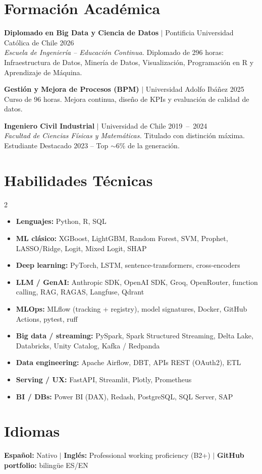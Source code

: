 \documentclass[a4paper,10pt]{article}
\newcommand{\sectionspace}{\vspace{0.15cm}}
\newcommand{\entryspace}{\vspace{0.12cm}}
\begin{document}
\sectionspace

\section*{Formación Académica}

\noindent\textbf{Diplomado en Big Data y Ciencia de Datos} $|$ Pontificia Universidad Católica de Chile \hfill 2026 \\
\textit{Escuela de Ingeniería -- Educación Continua.} Diplomado de 296 horas: Infraestructura de Datos, Minería de Datos, Visualización, Programación en R y Aprendizaje de Máquina.

\entryspace

\noindent\textbf{Gestión y Mejora de Procesos (BPM)} $|$ Universidad Adolfo Ibáñez \hfill 2025 \\
Curso de 96 horas. Mejora continua, diseño de KPIs y evaluación de calidad de datos.

\entryspace

\noindent\textbf{Ingeniero Civil Industrial} $|$ Universidad de Chile \hfill 2019~--~2024 \\
\textit{Facultad de Ciencias Físicas y Matemáticas.} Titulado con distinción máxima. Estudiante Destacado 2023 -- Top $\sim$6\% de la generación.

\sectionspace

\section*{Habilidades Técnicas}
\begin{multicols}{2}
\begin{itemize}
    \item \textbf{Lenguajes:} Python, R, SQL
    \item \textbf{ML clásico:} XGBoost, LightGBM, Random Forest, SVM, Prophet, LASSO/Ridge, Logit, Mixed Logit, SHAP
    \item \textbf{Deep learning:} PyTorch, LSTM, sentence-transformers, cross-encoders
    \item \textbf{LLM / GenAI:} Anthropic SDK, OpenAI SDK, Groq, OpenRouter, function calling, RAG, RAGAS, Langfuse, Qdrant
    \item \textbf{MLOps:} MLflow (tracking + registry), model signatures, Docker, GitHub Actions, pytest, ruff
    \item \textbf{Big data / streaming:} PySpark, Spark Structured Streaming, Delta Lake, Databricks, Unity Catalog, Kafka / Redpanda
    \item \textbf{Data engineering:} Apache Airflow, DBT, APIs REST (OAuth2), ETL
    \item \textbf{Serving / UX:} FastAPI, Streamlit, Plotly, Prometheus
    \item \textbf{BI / DBs:} Power BI (DAX), Redash, PostgreSQL, SQL Server, SAP
\end{itemize}
\end{multicols}

\vspace{-0.1cm}
\section*{Idiomas}
\textbf{Español:} Nativo \quad $|$ \quad \textbf{Inglés:} Professional working proficiency (B2+) \quad $|$ \quad \textbf{GitHub portfolio:} bilingüe ES/EN
\end{document}
